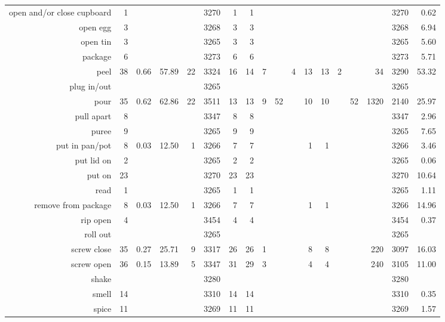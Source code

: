 \begin{tabular}{r r r@{\ \ }r@{\ \ }r@{\ \ }r@{\ \ }r r@{\ \ }r@{\ \ }r@{\ \ }r@{\ \ }r@{\ \ }r@{\ \ }r@{\ \ }r@{\ \ }r@{\ \ }r r}
open and/or close cupboard & 1 &  &  &  & 3270 & 1 & 1 &  &  &  &  &  &  &  &  & 3270 & 0.62 \\
open egg & 3 &  &  &  & 3268 & 3 & 3 &  &  &  &  &  &  &  &  & 3268 & 6.94 \\
open tin & 3 &  &  &  & 3265 & 3 & 3 &  &  &  &  &  &  &  &  & 3265 & 5.60 \\
package & 6 &  &  &  & 3273 & 6 & 6 &  &  &  &  &  &  &  &  & 3273 & 5.71 \\
peel & 38 & 0.66 & 57.89 & 22 & 3324 & 16 & 14 & 7 &  & 4 & 13 & 13 & 2 &  & 34 & 3290 & 53.32 \\
plug in/out &  &  &  &  & 3265 &  &  &  &  &  &  &  &  &  &  & 3265 &  \\
pour & 35 & 0.62 & 62.86 & 22 & 3511 & 13 & 13 & 9 & 52 &  & 10 & 10 &  & 52 & 1320 & 2140 & 25.97 \\
pull apart & 8 &  &  &  & 3347 & 8 & 8 &  &  &  &  &  &  &  &  & 3347 & 2.96 \\
puree & 9 &  &  &  & 3265 & 9 & 9 &  &  &  &  &  &  &  &  & 3265 & 7.65 \\
put in pan/pot & 8 & 0.03 & 12.50 & 1 & 3266 & 7 & 7 &  &  &  & 1 & 1 &  &  &  & 3266 & 3.46 \\
put lid on & 2 &  &  &  & 3265 & 2 & 2 &  &  &  &  &  &  &  &  & 3265 & 0.06 \\
put on & 23 &  &  &  & 3270 & 23 & 23 &  &  &  &  &  &  &  &  & 3270 & 10.64 \\
read & 1 &  &  &  & 3265 & 1 & 1 &  &  &  &  &  &  &  &  & 3265 & 1.11 \\
remove from package & 8 & 0.03 & 12.50 & 1 & 3266 & 7 & 7 &  &  &  & 1 & 1 &  &  &  & 3266 & 14.96 \\
rip open & 4 &  &  &  & 3454 & 4 & 4 &  &  &  &  &  &  &  &  & 3454 & 0.37 \\
roll out &  &  &  &  & 3265 &  &  &  &  &  &  &  &  &  &  & 3265 &  \\
screw close & 35 & 0.27 & 25.71 & 9 & 3317 & 26 & 26 & 1 &  &  & 8 & 8 &  &  & 220 & 3097 & 16.03 \\
screw open & 36 & 0.15 & 13.89 & 5 & 3347 & 31 & 29 & 3 &  &  & 4 & 4 &  &  & 240 & 3105 & 11.00 \\
shake &  &  &  &  & 3280 &  &  &  &  &  &  &  &  &  &  & 3280 &  \\
smell & 14 &  &  &  & 3310 & 14 & 14 &  &  &  &  &  &  &  &  & 3310 & 0.35 \\
spice & 11 &  &  &  & 3269 & 11 & 11 &  &  &  &  &  &  &  &  & 3269 & 1.57 \\

\end{tabular}
